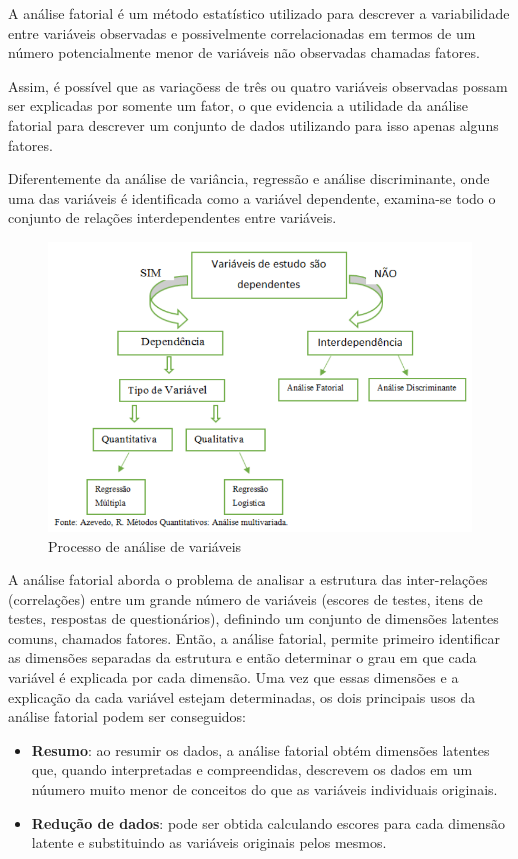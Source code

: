 \documentclass[12pt,brazil,oneside]{book}
\begin{document}
A análise fatorial é um método estatístico utilizado para descrever a
variabilidade entre variáveis observadas e possivelmente correlacionadas
em termos de um número potencialmente menor de variáveis não observadas
chamadas fatores.

Assim, é possível que as variaçõess de três ou quatro variáveis
observadas possam ser explicadas por somente um fator, o que evidencia a
utilidade da análise fatorial para descrever um conjunto de dados
utilizando para isso apenas alguns fatores.

Diferentemente da análise de variância, regressão e análise
discriminante, onde uma das variáveis é identificada como a variável
dependente, examina-se todo o conjunto de relações interdependentes
entre variáveis.

\begin{figure}[H]

{\centering \includegraphics[width=0.8\linewidth]{anfat1} 

}

\caption{Processo de análise de variáveis}\label{fig:unnamed-chunk-19}
\end{figure}

A análise fatorial aborda o problema de analisar a estrutura das
inter-relações (correlações) entre um grande número de variáveis
(escores de testes, itens de testes, respostas de questionários),
definindo um conjunto de dimensões latentes comuns, chamados fatores.
Então, a análise fatorial, permite primeiro identificar as dimensões
separadas da estrutura e então determinar o grau em que cada variável é
explicada por cada dimensão. Uma vez que essas dimensões e a explicação
da cada variável estejam determinadas, os dois principais usos da
análise fatorial podem ser conseguidos:

\begin{itemize}
\item
  \textbf{Resumo}: ao resumir os dados, a análise fatorial obtém
  dimensões latentes que, quando interpretadas e compreendidas,
  descrevem os dados em um núumero muito menor de conceitos do que as
  variáveis individuais originais.
\item
  \textbf{Redução de dados}: pode ser obtida calculando escores para
  cada dimensão latente e substituindo as variáveis originais pelos
  mesmos.
\end{itemize}
\end{document}
